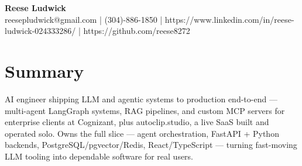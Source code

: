\documentclass[10pt]{article}
\begin{document}
\begin{center}
{\fontsize{14}{16}\selectfont\bfseries Reese Ludwick}\\[1pt]
{\fontsize{9}{11}\selectfont reesepludwick@gmail.com | (304)-886-1850 | https://www.linkedin.com/in/reese-ludwick-024333286/ | https://github.com/reese8272}
\end{center}
\vspace{-2pt}
\section*{Summary}
\noindent AI engineer shipping LLM and agentic systems to production end-to-end — multi-agent LangGraph systems, RAG pipelines, and custom MCP servers for enterprise clients at Cognizant, plus autoclip.studio, a live SaaS built and operated solo. Owns the full slice — agent orchestration, FastAPI + Python backends, PostgreSQL/pgvector/Redis, React/TypeScript — turning fast-moving LLM tooling into dependable software for real users.\par
\end{document}
